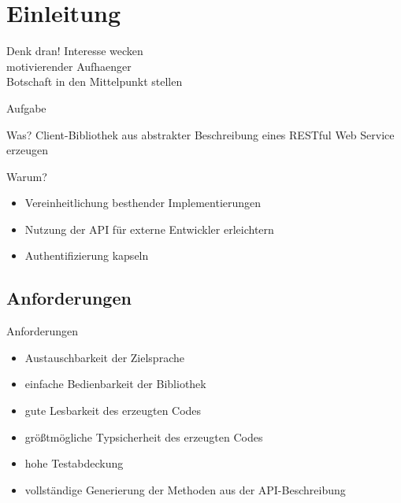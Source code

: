 \section{Einleitung}

\begin{frame}
    \begin{block}{Denk dran!}
        Interesse wecken\\
        motivierender Aufhaenger\\
        Botschaft in den Mittelpunkt stellen
    \end{block}
\end{frame}

\begin{frame}{Aufgabe}
    \begin{block}{Was?}
        Client-Bibliothek aus abstrakter Beschreibung eines RESTful Web Service erzeugen
    \end{block}

    \begin{block}{Warum?}
        \begin{itemize}
            \item Vereinheitlichung besthender Implementierungen
            \item Nutzung der API für externe Entwickler erleichtern
            \item Authentifizierung kapseln
        \end{itemize}
    \end{block}
\end{frame}

\subsection{Anforderungen}
\begin{frame}{Anforderungen}
    \begin{itemize}
        \item Austauschbarkeit der Zielsprache
        \item einfache Bedienbarkeit der Bibliothek
        \item gute Lesbarkeit des erzeugten Codes
        \item größtmögliche Typsicherheit des erzeugten Codes
        \item {\color{gray} hohe Testabdeckung}
        \item vollständige Generierung der Methoden aus der API-Beschreibung
    \end{itemize}
\end{frame}

